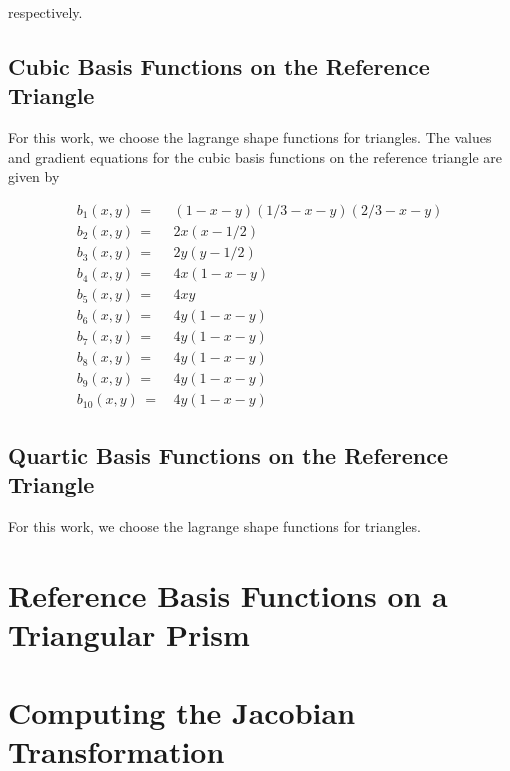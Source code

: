 \documentclass[11pt]{article}
\begin{document}
\noindent respectively.

\subsection{Cubic Basis Functions on the Reference Triangle}
\label{sec::triref_cubic}

For this work, we choose the lagrange shape functions for triangles. The values and gradient equations for the cubic basis functions on the reference triangle are given by

\begin{equation}
\label{eq::reftri_cubic_basis_vals}
\begin{aligned}
b_1(x,y) \, =& \, (1-x-y) (1/3-x-y) (2/3-x-y)\\
b_2(x,y) \, =& \, 2x(x-1/2) \\
b_3(x,y) \, =& \, 2y(y-1/2) \\
b_4(x,y) \, =& \, 4x (1-x-y) \\
b_5(x,y) \, =& \, 4xy\\
b_6(x,y) \, =& \, 4y (1-x-y) \\
b_7(x,y) \, =& \, 4y (1-x-y) \\
b_8(x,y) \, =& \, 4y (1-x-y) \\
b_9(x,y) \, =& \, 4y (1-x-y) \\
b_{10}(x,y) \, =& \, 4y (1-x-y) 
\end{aligned}
\end{equation}

\subsection{Quartic Basis Functions on the Reference Triangle}
\label{sec::triref_quartic}

For this work, we choose the lagrange shape functions for triangles.

\section{Reference Basis Functions on a Triangular Prism}
\label{sec::triprismref}

\section{Computing the Jacobian Transformation}
\label{sec::jacobian}
\end{document}
